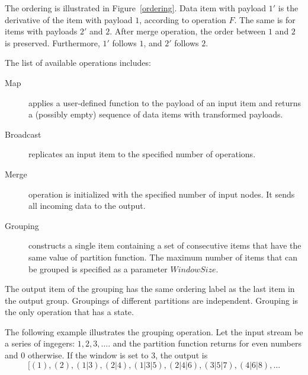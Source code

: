 The ordering is illustrated  in Figure~\ref{ordering}. Data item with payload $1'$ is the derivative of the item with payload $1$, according to operation $F$. The same is for items with payloads $2'$ and $2$. After merge operation, the order between $1$ and $2$ is preserved. Furthermore, $1'$ follows $1$, and $2'$ follows $2$.  



The list of available operations includes:
\begin {description}
\item [Map] applies a user-defined function to the payload of an input item and returns a (possibly empty) sequence of data items with transformed payloads. 

\item [Broadcast] replicates an input item to the specified number of operations.

\item [Merge] operation is initialized with the specified number of input nodes. It sends all incoming data to the output.

\item [Grouping] constructs a single item containing a set of consecutive items that have the same value of partition function. The maximum number of items that can be grouped is specified as a parameter  $Window Size.$ 
\end {description}

The output item of the grouping has the same ordering label as the last item in the output group. 
Groupings of different partitions are independent. 
Grouping is the only operation that has a state.


The following example illustrates  the grouping operation. 
Let the input stream be a series of ingegers: $ 1,2,3, \ldots.$ and the  partition function returns for even numbers and 0 otherwise. If the window is set to 3, the output is 
$$ [(1), (2), (1|3), (2|4), (1|3|5), (2|4|6), (3|5|7), (4|6|8), \ldots$$

